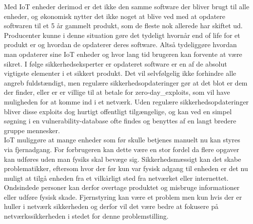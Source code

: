     Med IoT enheder derimod er det ikke den samme software der bliver brugt til alle enheder, og økonomisk nytter det ikke noget at blive ved med at opdatere softwaren til et 5 år gammelt produkt, som de fleste nok allerede har skiftet ud.
    Producenter kunne i denne situation gøre det tydeligt hvornår end of life  for et produkt er og hvordan de opdaterer deres software. Altså tydeliggøre hvordan man opdaterer sine IoT enheder og hvor lang tid brugeren kan forvente at være sikret. I følge sikkerhedseksperter er opdateret software er en af de absolut vigtigste elementer i et sikkert produkt. \autocite{soups2015}
    Det vil selvfølgelig ikke forhindre alle angreb fuldstændigt, men regulære sikkerhedsopdateringer gør at det blot er dem der finder, eller er er villige til at betale for \glspl{zero-day_exploit}, som vil have muligheden for at komme ind i et netværk. Uden regulære sikkerhedsopdateringer bliver disse exploits dog hurtigt offentligt tilgængelige, og kan ved en simpel søgning i en \gls{vulnerability-database} ofte findes og benyttes af en langt bredere gruppe mennesker.\\
    IoT muliggøre at mange enheder som før skulle betjenes manuelt nu kan styres via fjernadgang. For forbrugeren kan dette være en stor fordel da flere opgaver kan udføres uden man fysiks skal bevæge sig. Sikkerhedsmæssigt kan det skabe problematikker, eftersom hvor der før kun var fysisk adgang til enheden er det nu muligt at tilgå enheden fra et vilkårligt sted fra netværket eller internettet.\\ 
    Ondsindede personer kan derfor overtage produktet og misbruge informationer eller udføre fysisk skade. Fjernstyring kan være et problem men kun hvis der er huller i netværk sikkerheden og derfor vil det være bedre at fokusere på netværkssikkerheden i stedet for denne problemstilling.\autocite{Forbes2017}\\

